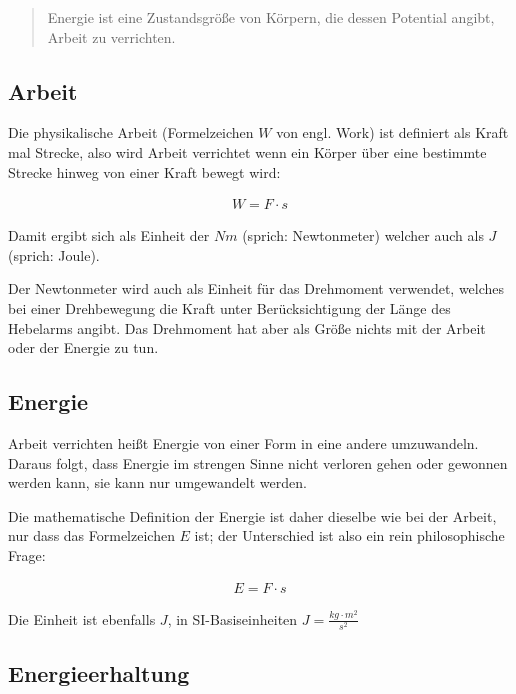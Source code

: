 \begin{quote}
\glqq Energie ist eine Zustandsgröße von Körpern, die dessen Potential angibt, Arbeit zu verrichten.\grqq
\end{quote}

\subsection{Arbeit}

Die physikalische \glqq Arbeit\grqq{} (Formelzeichen $W$ von engl. \glqq Work\grqq ) ist definiert als Kraft mal Strecke, also wird Arbeit verrichtet wenn ein Körper über eine bestimmte Strecke hinweg von einer Kraft bewegt wird:

\begin{align}
	W = F \cdot s
\end{align}

\noindent Damit ergibt sich als Einheit der $Nm$ (sprich: \glqq Newtonmeter\grqq ) welcher auch als $J$ (sprich: \glqq Joule\grqq ).

\begin{Anmerkung}
Der Newtonmeter wird auch als Einheit für das Drehmoment verwendet, welches bei einer Drehbewegung die Kraft unter Berücksichtigung der Länge des Hebelarms angibt. Das Drehmoment hat aber als Größe nichts mit der Arbeit oder der Energie zu tun.
\end{Anmerkung}


\subsection{Energie}

\glqq Arbeit verrichten\grqq{} heißt Energie von einer Form in eine andere umzuwandeln. Daraus folgt, dass Energie im strengen Sinne nicht verloren gehen oder gewonnen werden kann, sie kann nur umgewandelt werden.

Die mathematische Definition der Energie ist daher dieselbe wie bei der Arbeit, nur dass das Formelzeichen $E$ ist; der Unterschied ist also ein rein philosophische Frage:

\begin{align}	\label{eq:energiedef}
	E = F \cdot s
\end{align}

\noindent Die Einheit ist ebenfalls $J$, in SI-Basiseinheiten $J=\frac{kg \cdot m^2}{s^2}$


\subsection{Energieerhaltung}

